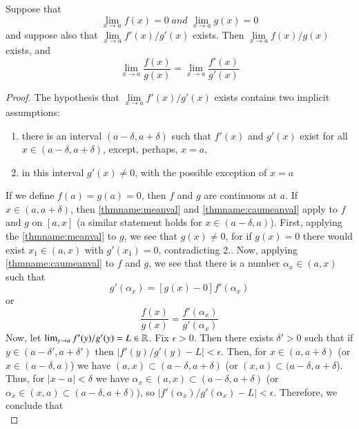 \documentclass[12pt, a4paper, oneside, openright, titlepage]{book}
\begin{document}
\begin{namthm}
    Suppose that \begin{equation}
        \lim\limits_{x\rightarrow a}f(x) = 0\;and\;\lim\limits_{x\rightarrow a}g(x) = 0
    \end{equation}
    and suppose also that $\lim\limits_{x\rightarrow a}f'(x)/g'(x)$ exists. Then $\lim\limits_{x\rightarrow a}f(x)/g(x)$ exists, and \begin{equation}
        \lim\limits_{x\rightarrow a}\frac{f(x)}{g(x)} = \lim\limits_{x\rightarrow a}\frac{f'(x)}{g'(x)}
    \end{equation}
\end{namthm}
\begin{proof}
    The hypothesis that $\lim\limits_{x\rightarrow a}f'(x)/g'(x)$ exists contains two implicit assumptions: \begin{enumerate}
        \item there is an interval $(a-\delta,a+\delta)$ such that $f'(x)$ and $g'(x)$ exist for all $x \in (a - \delta, a + \delta)$, except, perhaps, $x = a$,
        \item in this interval $g'(x) \neq 0$, with the possible exception of $x = a$
    \end{enumerate}
    If we define $f(a) = g(a) = 0$, then $f$ and $g$ are continuous at $a$. If $x \in (a,a+\delta)$, then \ref{thmname:meanval} and \ref{thmname:caumeanval} apply to $f$ and $g$ on $[a,x]$ (a similar statement holds for $x \in (a-\delta, a)$). First, applying the \ref{thmname:meanval} to $g$, we see that $g(x) \neq 0$, for if $g(x) = 0$ there would exist $x_1 \in (a,x)$ with $g'(x_1) = 0$, contradicting 2.. Now, applying \ref{thmname:caumeanval} to $f$ and $g$, we see that there is a number $\alpha_x \in (a,x)$ such that \begin{equation*}
        [f(x)-0]g'(\alpha_x) = [g(x)-0]f'(\alpha_x)
    \end{equation*}
    or \begin{equation*}
        \frac{f(x)}{g(x)} = \frac{f'(\alpha_x)}{g'(\alpha_x)}
    \end{equation*}
    Now, let $\lim_{y\rightarrow a}f'(y)/g'(y) = L \in \mathbb R$. Fix $\epsilon > 0$. Then there exists $\delta' > 0$ such that if $y \in (a - \delta', a + \delta')$ then $|f'(y)/g'(y) - L| < \epsilon$. Then, for $x \in (a,a+\delta)$ (or $x \in (a-\delta, a)$) we have $(a,x) \subset (a-\delta, a+\delta)$ (or $(x,a) \subset (a-\delta, a+\delta$). Thus, for $|x-a| < \delta$ we have $\alpha_x \in (a,x) \subset (a -\delta, a+\delta)$ (or $\alpha_x \in (x,a) \subset (a-\delta,a+\delta)$), so $|f'(\alpha_x)/g'(\alpha_x) - L| < \epsilon$. Therefore, we conclude that \begin{equation*}

\end{equation*}
\end{proof}
\end{document}
